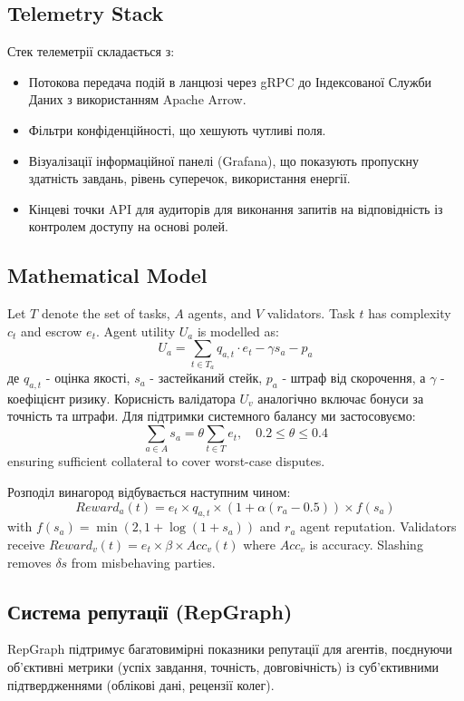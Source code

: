 \documentclass[11pt]{article}
\begin{document}
\subsection{Telemetry Stack}
Стек телеметрії складається з:
\begin{itemize}[noitemsep]
  \item Потокова передача подій в ланцюзі через gRPC до Індексованої Служби Даних з використанням Apache Arrow.
  \item Фільтри конфіденційності, що хешують чутливі поля.
  \item Візуалізації інформаційної панелі (Grafana), що показують пропускну здатність завдань, рівень суперечок, використання енергії.
  \item Кінцеві точки API для аудиторів для виконання запитів на відповідність із контролем доступу на основі ролей.
\end{itemize}

\subsection{Mathematical Model}
Let $T$ denote the set of tasks, $A$ agents, and $V$ validators. Task $t$ has complexity $c_t$ and escrow $e_t$. Agent utility $U_a$ is modelled as:
\begin{equation}
U_a = \sum_{t \in T_a} q_{a,t}\cdot e_t - \gamma s_a - p_a\label{eq:agent-utility}
\end{equation}
де $q_{a,t}$ - оцінка якості, $s_a$ - застейканий стейк, $p_a$ - штраф від скорочення, а $\gamma$ - коефіцієнт ризику. Корисність валідатора $U_v$ аналогічно включає бонуси за точність та штрафи. Для підтримки системного балансу ми застосовуємо:
\begin{equation}
\sum_{a \in A} s_a = \theta \sum_{t \in T} e_t,\quad 0.2 \leq \theta \leq 0.4
\end{equation}
ensuring sufficient collateral to cover worst-case disputes.

Розподіл винагород відбувається наступним чином:
\begin{equation}
Reward_a(t) = e_t \times q_{a,t} \times \left(1 + \alpha (r_a - 0.5)\right) \times f(s_a)
\end{equation}
with $f(s_a) = \min(2, 1 + \log(1+s_a))$ and $r_a$ agent reputation. Validators receive $Reward_v(t) = e_t \times \beta \times Acc_v(t)$ where $Acc_v$ is accuracy. Slashing removes $\delta s$ from misbehaving parties.

\subsection{Система репутації (RepGraph)}
\label{sec:reputation}
RepGraph підтримує багатовимірні показники репутації для агентів, поєднуючи об'єктивні метрики (успіх завдання, точність, довговічність) із суб'єктивними підтвердженнями (облікові дані, рецензії колег).
\end{document}
